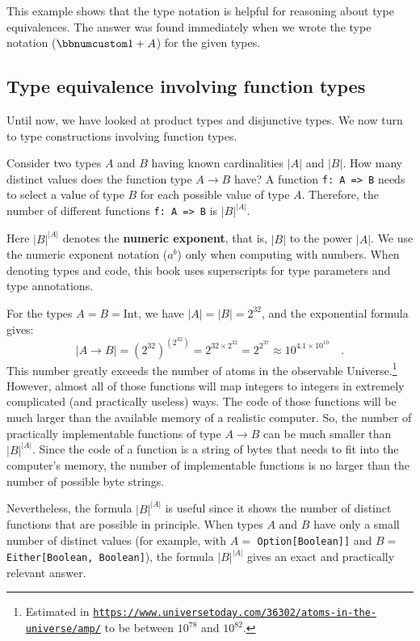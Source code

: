 This example shows that the type notation is helpful for reasoning
about type equivalences. The answer was found immediately when we
wrote the type notation ($\bbnum 1+A$) for the given types.

\subsection{Type equivalence involving function types}

Until now, we have looked at product types and disjunctive types.
We now turn to type constructions involving function types.

Consider two types $A$ and $B$ having known cardinalities $\left|A\right|$
and $\left|B\right|$. How many distinct values does the function
type $A\rightarrow B$ have? A function \lstinline!f: A => B! needs
to select a value of type $B$ for each possible value of type $A$.
Therefore, the number of different functions \lstinline!f: A => B!
is $\left|B\right|^{\left|A\right|}$. 

Here $\left|B\right|^{\left|A\right|}$ denotes the \textbf{numeric
exponent}, that is, $\left|B\right|$ to the power
$\left|A\right|$. We use the numeric exponent notation ($a^{b}$)
only when computing with numbers. When denoting types and code, this
book uses superscripts for type parameters and type annotations.

For the types $A=B=\text{Int}$, we have $\left|A\right|=\left|B\right|=2^{32}$,
and the exponential formula gives:
\[
\left|A\rightarrow B\right|=(2^{32})^{\left(2^{32}\right)}=2^{32\times2^{32}}=2^{2^{37}}\approx10^{4.1\times10^{10}}\quad.
\]
This number greatly exceeds the number of atoms in the observable
Universe.\footnote{Estimated in \texttt{\href{https://www.universetoday.com/36302/atoms-in-the-universe/amp/}{https://www.universetoday.com/36302/atoms-in-the-universe/amp/}}
to be between $10^{78}$ and $10^{82}$.} However, almost all of those functions will map integers to integers
in extremely complicated (and practically useless) ways. The code
of those functions will be much larger than the available memory of
a realistic computer. So, the number of practically implementable
functions of type $A\rightarrow B$ can be much smaller than $\left|B\right|^{\left|A\right|}$.
Since the code of a function is a string of bytes that needs to fit
into the computer\textsf{'}s memory, the number of implementable functions
is no larger than the number of possible byte strings.

Nevertheless, the formula $\left|B\right|^{\left|A\right|}$ is useful
since it shows the number of distinct functions that are possible
in principle. When types $A$ and $B$ have only a small number of
distinct values (for example, with $A=$ \lstinline!Option[Boolean]]!
and $B=$ \lstinline!Either[Boolean, Boolean]!), the formula $\left|B\right|^{\left|A\right|}$
gives an exact and practically relevant answer.

